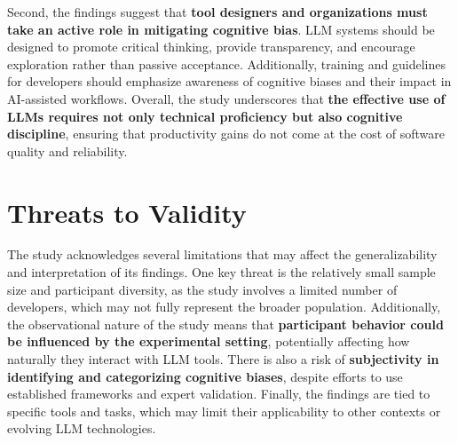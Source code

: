 Second, the findings suggest that \textbf{tool designers and organizations must take an active role in mitigating cognitive bias}. LLM systems should be designed to promote critical thinking, provide transparency, and encourage exploration rather than passive acceptance. Additionally, training and guidelines for developers should emphasize awareness of cognitive biases and their impact in AI-assisted workflows. Overall, the study underscores that \textbf{the effective use of LLMs requires not only technical proficiency but also cognitive discipline}, ensuring that productivity gains do not come at the cost of software quality and reliability.

\section{Threats to Validity}
The study acknowledges several limitations that may affect the generalizability and interpretation of its findings. One key threat is the relatively small sample size and participant diversity, as the study involves a limited number of developers, which may not fully represent the broader population. Additionally, the observational nature of the study means that \textbf{participant behavior could be influenced by the experimental setting}, potentially affecting how naturally they interact with LLM tools. There is also a risk of \textbf{subjectivity in identifying and categorizing cognitive biases}, despite efforts to use established frameworks and expert validation. Finally, the findings are tied to specific tools and tasks, which may limit their applicability to other contexts or evolving LLM technologies.

